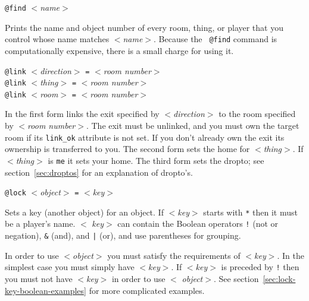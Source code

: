 \begin{simple}
\item[]
\begin{flushleft}
{\tt @find} $<${\em name\/}$>$
\end{flushleft}
Prints the name and object number of every room, thing, or player that
you control whose name matches $<${\em name\/}$>$.  Because the {\tt
@find} command is computationally expensive, there is a small charge
for using it.

\dorule

\item[]
\begin{flushleft}
{\tt @link} $<${\em direction\/}$>$ \verb|=| $<${\em room number\/}$>$ \\
{\tt @link} $<${\em thing\/}$>$ \verb|=| $<${\em room number\/}$>$ \\
{\tt @link} $<${\em room\/}$>$ \verb|=| $<${\em room number\/}$>$
\end{flushleft}
In the first form links the exit specified by $<${\em direction\/}$>$
to the room specified by $<${\em room number\/}$>$.  The exit must be
unlinked, and you must own the target room if its
\verb|link_ok| attribute is not set.  If
you don't already own the exit its ownership is transferred to you.
The second form sets the home for $<${\em thing\/}$>$.  If
$<${\em thing\/}$>$ is {\tt me} it sets your home.
The third form sets the dropto; see section~\ref{sec:droptos} for an
explanation of dropto's.

\dorule

\item[]
\begin{flushleft}
{\tt @lock} $<${\em object\/}$>$ \verb|=| $<${\em key\/}$>$
\end{flushleft}
Sets a key (another object) for an object.  If $<${\em key\/}$>$
starts with \verb|*| then it must be a player's name.  $<${\em
key\/}$>$ can contain the Boolean operators \verb|!| (not or
negation), \verb|&| (and), and \verb:|: (or), and use parentheses for
grouping.

In order to use $<${\em object\/}$>$ you must satisfy the requirements
of $<${\em key\/}$>$.  In the simplest case you must simply have
$<${\em key\/}$>$.  If $<${\em key\/}$>$ is preceded by \verb|!| then
you must not have $<${\em key\/}$>$ in order to use $<${\em
object\/}$>$.  See section~\ref{sec:lock-key-boolean-examples} for
more complicated examples.


\end{simple}
